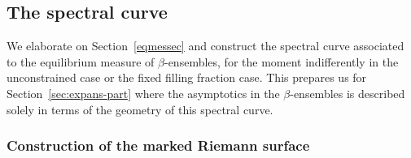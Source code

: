 \documentclass[pdftex]{sigma}
\numberwithin{equation}{section}
\begin{document}
\subsection{The spectral curve}

We elaborate on Section~\ref{eqmessec} and construct the spectral curve associated to the equilibrium measure of ${\beta}$-ensembles, for the moment indifferently in the unconstrained case or the fixed filling fraction case. This prepares us for Section~\ref{sec:expans-part} where the asymptotics in the $\beta$-ensembles is described solely in terms of the geometry of this spectral curve.

\subsubsection{Construction of the marked Riemann surface}
\label{sec:constr-spectr-curve}
\end{document}
